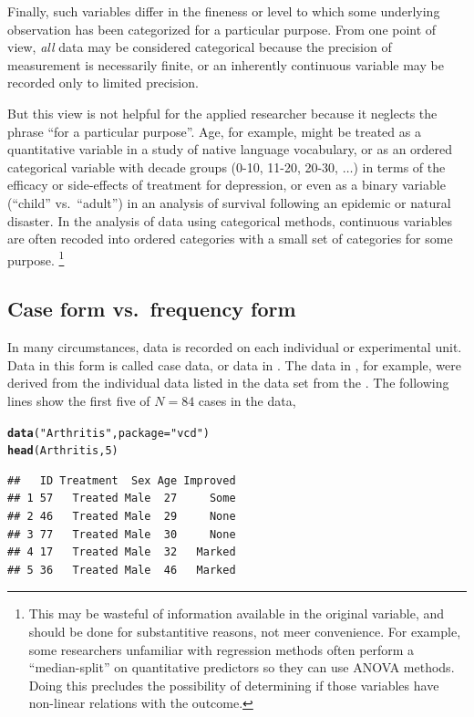 \documentclass[11pt]{book}\usepackage[]{graphicx}\usepackage[]{color}
\makeatletter
\newcommand{\hlnum}[1]{\textcolor[rgb]{0.686,0.059,0.569}{#1}}%
\newcommand{\hlstr}[1]{\textcolor[rgb]{0.192,0.494,0.8}{#1}}%
\newcommand{\hlstd}[1]{\textcolor[rgb]{0.345,0.345,0.345}{#1}}%
\newcommand{\hlkwc}[1]{\textcolor[rgb]{0.333,0.667,0.333}{#1}}%
\newcommand{\hlkwd}[1]{\textcolor[rgb]{0.737,0.353,0.396}{\textbf{#1}}}%
\newenvironment{kframe}{%
 \def\at@end@of@kframe{}%
 \ifinner\ifhmode%
  \def\at@end@of@kframe{\end{minipage}}%
  \begin{minipage}{\columnwidth}%
 \fi\fi%
 \def\FrameCommand##1{\hskip\@totalleftmargin \hskip-\fboxsep
 \colorbox{shadecolor}{##1}\hskip-\fboxsep
     \hskip-\linewidth \hskip-\@totalleftmargin \hskip\columnwidth}%
 \MakeFramed {\advance\hsize-\width
   \@totalleftmargin\z@ \linewidth\hsize
   \@setminipage}}%
 {\par\unskip\endMakeFramed%
 \at@end@of@kframe}
\newenvironment{knitrout}{}{} %
\renewenvironment{knitrout}{\small\renewcommand{\baselinestretch}{.85}}{} %
\makeatother
\begin{document}
Finally, such variables differ in the
fineness or level to which some underlying observation has been
categorized for a particular purpose.
From one point of view, \emph{all} data
may be considered categorical because the precision of measurement
is necessarily finite, or an inherently continuous variable may be recorded only to limited precision.   

But this view is not helpful for the applied
researcher because it neglects the phrase ``for a particular purpose''.
Age, for example, might be treated as a quantitative variable in a study of native language vocabulary, or as an ordered categorical variable 
with decade groups (0-10, 11-20, 20-30, $\dots$)
in terms of
the efficacy or side-effects of treatment for depression, or even as a
binary variable (``child'' vs.\  ``adult'') in an analysis of survival following an epidemic or natural disaster. In the analysis of
data using categorical methods, continuous variables are often recoded
into ordered categories with a small set of categories for some purpose.%
\footnote{
This may be wasteful of information available in the original
variable, and should be done for substantitive reasons, not meer
convenience.  For example, some researchers unfamiliar with
regression methods often perform a ``median-split'' on 
quantitative predictors
so they can use ANOVA methods. Doing this precludes the possibility
of determining if those variables have non-linear relations with
the outcome.
}

\subsection{Case form vs.\ frequency form}\label{sec:case-freq}
In many circumstances, data is recorded on each individual or experimental
unit.  Data in this form is called case data,
or data in .
The data in , for example, were derived from
the individual data listed in the data set 
from the .  The following lines show the first
five  of $N=84$ cases in the  data,
\begin{knitrout}
\color{fgcolor}\begin{kframe}
\begin{alltt}
\hlkwd{data}\hlstd{(}\hlstr{"Arthritis"}\hlstd{,} \hlkwc{package}\hlstd{=}\hlstr{"vcd"}\hlstd{)}
\hlkwd{head}\hlstd{(Arthritis,} \hlnum{5}\hlstd{)}
\end{alltt}
\begin{verbatim}
##   ID Treatment  Sex Age Improved
## 1 57   Treated Male  27     Some
## 2 46   Treated Male  29     None
## 3 77   Treated Male  30     None
## 4 17   Treated Male  32   Marked
## 5 36   Treated Male  46   Marked
\end{verbatim}
\end{kframe}
\end{knitrout}
\end{document}
